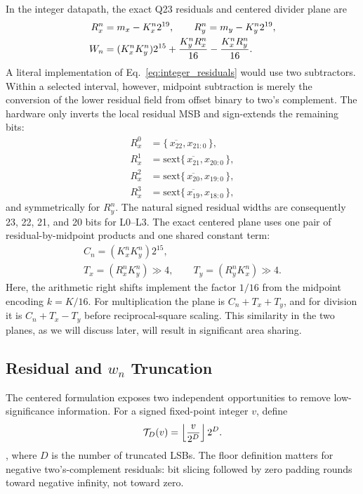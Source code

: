 \documentclass[conference]{IEEEtran}
\begin{document}
In the integer datapath, the exact Q23 residuals and centered divider plane are
\begin{align}
 R_x^n &=m_x-K_x^n2^{19},\qquad R_y^n=m_y-K_y^n2^{19},
 \label{eq:integer_residuals}\\
 W_n &=(K_x^nK_y^n)2^{15}+{K_y^nR_x^n\over16}
                         -{K_x^nR_y^n\over16}.
 \label{eq:integer_centered_plane}
\end{align}
A literal implementation of Eq.~\eqref{eq:integer_residuals} would use two
subtractors. Within a selected interval, however, midpoint subtraction is
merely the conversion of the lower residual field from offset binary to
two's complement. The hardware only inverts the local residual MSB and
sign-extends the remaining bits:
\begin{equation}
\begin{aligned}
 R_x^0 &= \{\,\overline{x_{22}},x_{21:0}\,\},\\
 R_x^1 &= \mathrm{sext}\{\,\overline{x_{21}},x_{20:0}\,\},\\
 R_x^2 &= \mathrm{sext}\{\,\overline{x_{20}},x_{19:0}\,\},\\
 R_x^3 &= \mathrm{sext}\{\,\overline{x_{19}},x_{18:0}\,\},
\end{aligned}
\label{eq:centered_residual_recode}
\end{equation}
and symmetrically for $R_y^n$. The natural signed residual widths
are consequently 23, 22, 21, and 20 bits for L0--L3. The exact centered plane
uses one pair of residual-by-midpoint products and one shared constant term:
\begin{gather}
 C_n = (K_x^nK_y^n)2^{15},\\
 T_x = (R_x^nK_y^n) \gg 4,\qquad
 T_y = (R_y^nK_x^n) \gg 4.
\end{gather}
Here, the arithmetic right shifts implement the factor $1/16$ from the midpoint encoding $k=K/16$.
For multiplication the plane is $C_n+T_x+T_y$, and for division it is
$C_n+T_x-T_y$ before reciprocal-square scaling. This similarity in the two planes, as we will discuss later, will result in significant area sharing.

\subsection{Residual and $w_n$ Truncation}
The centered formulation exposes two independent opportunities to remove
low-significance information. For a signed fixed-point integer $v$, define
\begin{equation}
 \mathcal{T}_D(v)=\left\lfloor{v\over2^D}\right\rfloor2^D.
 \label{eq:truncation_operator}
\end{equation}
, where $D$ is the number of truncated LSBs. The floor definition matters for negative two's-complement residuals: bit
slicing followed by zero padding rounds toward negative infinity, not toward
zero.
\end{document}
